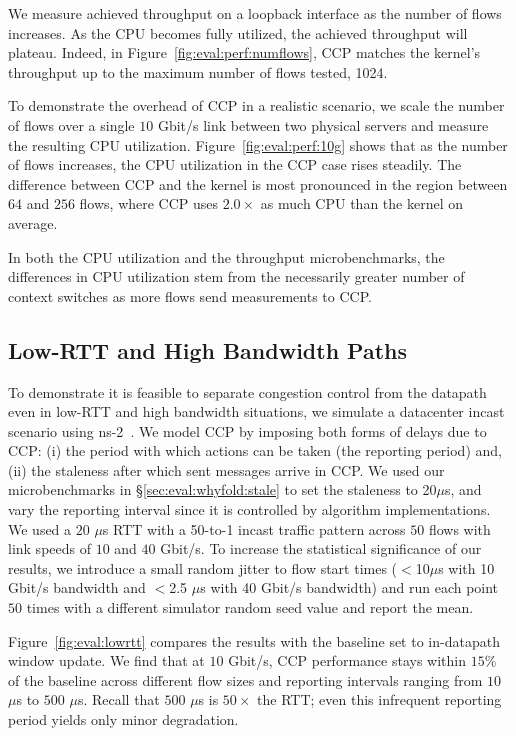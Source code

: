  We measure achieved throughput on a loopback interface as the number of flows increases. As the CPU becomes fully utilized, the achieved throughput will plateau. Indeed, in Figure~\ref{fig:eval:perf:numflows}, CCP matches the kernel's throughput up to the maximum number of flows tested, 1024. 

 To demonstrate the overhead of CCP in a realistic scenario, we scale the number of flows over a single $10$ Gbit/s link between two physical servers and measure the resulting CPU utilization.
Figure~\ref{fig:eval:perf:10g} shows that as the number of flows increases, the CPU utilization in the CCP case rises steadily. The difference between CCP and the kernel is most pronounced in the region between $64$ and $256$ flows, where CCP uses $2.0\times$ as much CPU than the kernel on average.

In both the CPU utilization and the throughput microbenchmarks, the differences in CPU utilization stem from the necessarily greater number of context switches as more flows send measurements to CCP.

\subsection{Low-RTT and High Bandwidth Paths}
\label{sec:eval:lowrtt}

To demonstrate it is feasible to separate congestion control from the datapath even in low-RTT and high bandwidth situations, we simulate a datacenter incast scenario using ns-2~\cite{ns2}.
We model CCP by imposing both forms of delays due to CCP: (i) the period with which actions can be taken (the reporting period) and, (ii) the staleness after which sent messages arrive in CCP. We used our microbenchmarks in \S\ref{sec:eval:whyfold:stale} to set the staleness to 20$\mu$s, and vary the reporting interval since it is controlled by algorithm implementations. 
We used a $20$ $\mu$s RTT with a 50-to-1 incast traffic pattern across $50$ flows with link speeds of $10$ and $40$ Gbit/s. To increase the statistical significance of our results, we introduce a small random jitter to flow start times ($<$10$ \mu$s with 10 Gbit/s bandwidth and $<$2.5 $\mu$s with 40 Gbit/s bandwidth) and run each point $50$ times with a different simulator random seed value and report the mean.

Figure~\ref{fig:eval:lowrtt} compares the results with the baseline set to in-datapath window update. 
We find that at $10$ Gbit/s, CCP performance stays within $15$\% of the baseline across different flow sizes and reporting intervals ranging from $10$ $\mu$s to $500$ $\mu$s. 
Recall that $500$ $\mu$s is $50\times$ the RTT; even this infrequent reporting period yields only minor degradation.


